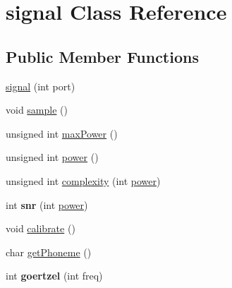 \hypertarget{classsignal}{\section{signal Class Reference}
\label{classsignal}
}
\subsection*{Public Member Functions}
\begin{DoxyCompactItemize}
\item 
\hyperlink{classsignal_a16fc90703b77adff91d00f7a80f44059}{signal} (int port)
\item 
void \hyperlink{classsignal_aaba77b67c912d6aa7c36bd335d8381f4}{sample} ()
\item 
unsigned int \hyperlink{classsignal_a0acbadb8a805a5b0feca58904e843313}{max\-Power} ()
\item 
unsigned int \hyperlink{classsignal_aa0c0c4f353dd02096eed32044ac463d7}{power} ()
\item 
unsigned int \hyperlink{classsignal_a85b7cdd5ebc3231add890ef7c561f7c0}{complexity} (int \hyperlink{classsignal_aa0c0c4f353dd02096eed32044ac463d7}{power})
\item 
\hypertarget{classsignal_a23ecaa2397b4ac93ee7c0cd51d36668c}{int {\bfseries snr} (int \hyperlink{classsignal_aa0c0c4f353dd02096eed32044ac463d7}{power})}\label{classsignal_a23ecaa2397b4ac93ee7c0cd51d36668c}

\item 
void \hyperlink{classsignal_a6a19e421bd022a93575032165868a78c}{calibrate} ()
\item 
char \hyperlink{classsignal_a85bf609441248bb75d15d7c2999a77b8}{get\-Phoneme} ()
\item 
\hypertarget{classsignal_ab6154ad820e9dfb145e8362ea00e38b8}{int {\bfseries goertzel} (int freq)}\label{classsignal_ab6154ad820e9dfb145e8362ea00e38b8}

\end{DoxyCompactItemize}
